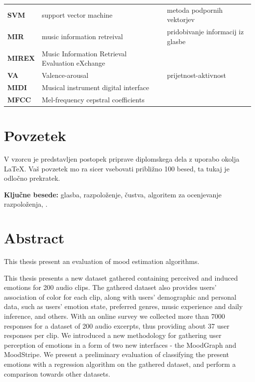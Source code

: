 \documentclass[a4paper, 12pt]{book}
\newcommand{\tkeywords}{glasba, razpoloženje, čustva, algoritem za ocenjevanje razpoloženja, }
\newcommand{\clearemptydoublepage}{\newpage{\pagestyle{empty}\cleardoublepage}}
\begin{document}
{\begin{tabular}{l|l|l}
  
  {\bf SVM} & support vector machine & metoda podpornih vektorjev \\
  {\bf MIR} & music information retreival & pridobivanje informacij iz glasbe \\
  {\bf MIREX} & Music Information Retrieval Evaluation eXchange &  \\
  {\bf VA} & Valence-arousal & prijetnost-aktivnost \\
  {\bf MIDI} & Musical instrument digital interface \\
  {\bf MFCC} & Mel-frequency cepstral coefficients \\
  
  
  

\end{tabular}



\clearemptydoublepage

\chapter*{Povzetek}
V vzorcu je predstavljen postopek priprave diplomskega dela z uporabo okolja \LaTeX. Vaš povzetek mo ra sicer vsebovati približno 100 besed, ta tukaj je odločno prekratek.
\bigskip

\noindent\textbf{Ključne besede:} \tkeywords.
\clearemptydoublepage

\chapter*{Abstract}

This thesis present an evaluation of mood estimation algorithms. 

This thesis presents a new dataset gathered containing perceived and induced emotions for 200 audio clips. The gathered dataset also provides users' association of color for each clip, along with users' demographic and personal data, such as users' emotion state, preferred genres, music experience and daily inference, and others. With an online survey we collected more than 7000 responses for a dataset of 200 audio excerpts, thus providing about 37 user responses per clip. We introduced a new methodology for gathering user perception of emotions in a form of two new interfaces - the MoodGraph and MoodStripe. We present a preliminary evaluation of classifying the present emotions with a regression algorithm on the gathered dataset, and perform a comparison towards other datasets.

}
\end{document}
